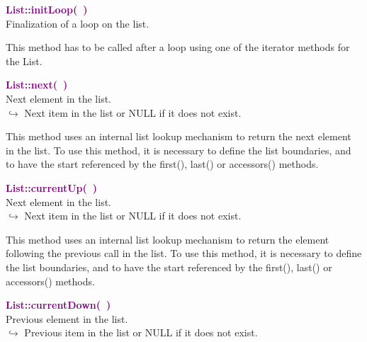 \textcolor{purple}{\textbf{List::initLoop(~)}}\label{List::initLoop()}\\
Finalization of a loop on the list.

This method has to be called after a loop using one of the iterator methods for the List.

\textcolor{purple}{\textbf{List::next(~)}}\label{List::next()}\\
Next element in the list.\\ \hspace*{10mm}$\hookrightarrow$ Next item in the list or NULL if it does not exist.

This method uses an internal list lookup mechanism to return the next element in the list.
To use this method, it is necessary to define the list boundaries, and to have the start referenced by the first(), last() or accessors() methods.

\textcolor{purple}{\textbf{List::currentUp(~)}}\label{List::currentUp()}\\
Next element in the list.\\ \hspace*{10mm}$\hookrightarrow$ Next item in the list or NULL if it does not exist.

This method uses an internal list lookup mechanism to return the element following the previous call in the list.
To use this method, it is necessary to define the list boundaries, and to have the start referenced by the first(), last() or accessors() methods.

\textcolor{purple}{\textbf{List::currentDown(~)}}\label{List::currentDown()}\\
Previous element in the list.\\ \hspace*{10mm}$\hookrightarrow$ Previous item in the list or NULL if it does not exist.


